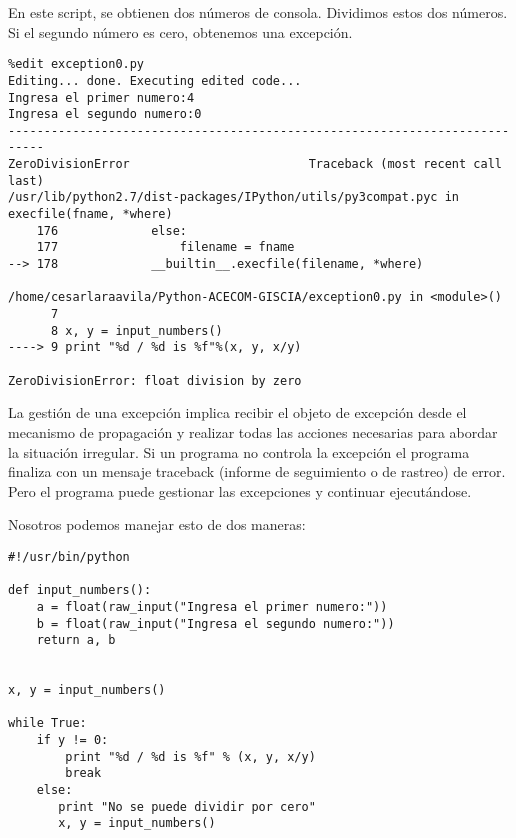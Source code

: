 \documentclass[twoside,10.5pt]{article}%
\begin{document}
\vspace{0.3cm}

En este script, se obtienen dos n\'umeros de  consola. Dividimos estos dos n\'umeros. Si el segundo n\'umero es cero, obtenemos una excepci\'on.

\vspace{0.3cm}

\begin{verbatim}
%edit exception0.py
Editing... done. Executing edited code...
Ingresa el primer numero:4
Ingresa el segundo numero:0
---------------------------------------------------------------------------
ZeroDivisionError                         Traceback (most recent call last)
/usr/lib/python2.7/dist-packages/IPython/utils/py3compat.pyc in execfile(fname, *where)
    176             else:
    177                 filename = fname
--> 178             __builtin__.execfile(filename, *where)

/home/cesarlaraavila/Python-ACECOM-GISCIA/exception0.py in <module>()
      7 
      8 x, y = input_numbers()
----> 9 print "%d / %d is %f"%(x, y, x/y)

ZeroDivisionError: float division by zero

\end{verbatim}

\vspace{0.3cm}


La gesti\'on de una excepci\'on implica recibir el objeto de excepci\'on desde el mecanismo de propagaci\'on y realizar todas las acciones necesarias para abordar la situaci\'on irregular. Si un programa no controla la excepci\'on el programa finaliza con un mensaje {\color{blue} traceback (informe de seguimiento o de rastreo)} de error. Pero el programa puede gestionar las excepciones y continuar ejecut\'andose.

Nosotros podemos manejar esto de dos maneras:

\vspace{0.3cm}

\begin{verbatim}
#!/usr/bin/python

def input_numbers():
    a = float(raw_input("Ingresa el primer numero:"))
    b = float(raw_input("Ingresa el segundo numero:"))
    return a, b


x, y = input_numbers()

while True:
    if y != 0:
        print "%d / %d is %f" % (x, y, x/y)
        break
    else:
       print "No se puede dividir por cero"
       x, y = input_numbers()
\end{verbatim}
\end{document}
